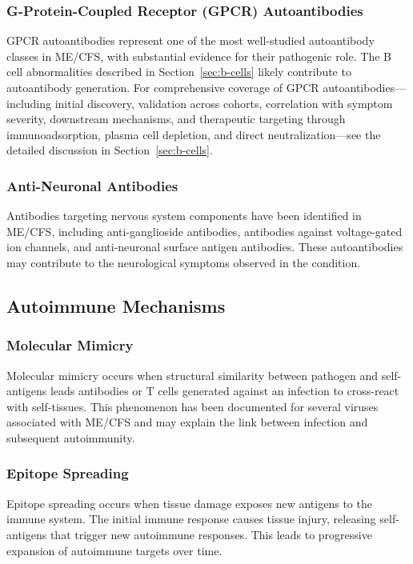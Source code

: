 \subsubsection{G-Protein-Coupled Receptor (GPCR) Autoantibodies}

GPCR autoantibodies represent one of the most well-studied autoantibody classes in ME/CFS, with substantial evidence for their pathogenic role. The B cell abnormalities described in Section~\ref{sec:b-cells} likely contribute to autoantibody generation. For comprehensive coverage of GPCR autoantibodies---including initial discovery, validation across cohorts, correlation with symptom severity, downstream mechanisms, and therapeutic targeting through immunoadsorption, plasma cell depletion, and direct neutralization---see the detailed discussion in Section~\ref{sec:b-cells}.

\subsubsection{Anti-Neuronal Antibodies}

Antibodies targeting nervous system components have been identified in ME/CFS, including anti-ganglioside antibodies, antibodies against voltage-gated ion channels, and anti-neuronal surface antigen antibodies. These autoantibodies may contribute to the neurological symptoms observed in the condition.

\subsection{Autoimmune Mechanisms}
\label{sec:autoimmune-mechanisms}

\subsubsection{Molecular Mimicry}

Molecular mimicry occurs when structural similarity between pathogen and self-antigens leads antibodies or T cells generated against an infection to cross-react with self-tissues. This phenomenon has been documented for several viruses associated with ME/CFS and may explain the link between infection and subsequent autoimmunity.

\subsubsection{Epitope Spreading}

Epitope spreading occurs when tissue damage exposes new antigens to the immune system. The initial immune response causes tissue injury, releasing self-antigens that trigger new autoimmune responses. This leads to progressive expansion of autoimmune targets over time.

